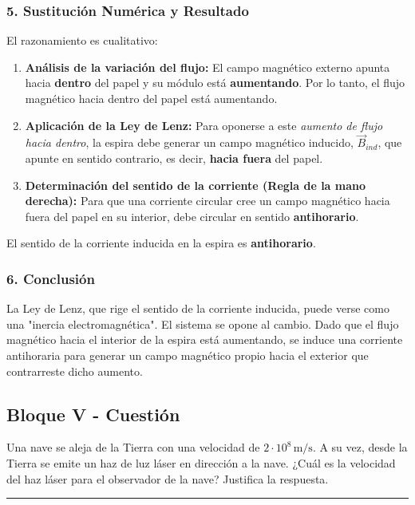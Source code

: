 \subsubsection*{5. Sustitución Numérica y Resultado}
El razonamiento es cualitativo:
\begin{enumerate}
    \item \textbf{Análisis de la variación del flujo:} El campo magnético externo apunta hacia \textbf{dentro} del papel y su módulo está \textbf{aumentando}. Por lo tanto, el flujo magnético hacia dentro del papel está aumentando.
    \item \textbf{Aplicación de la Ley de Lenz:} Para oponerse a este \textit{aumento de flujo hacia dentro}, la espira debe generar un campo magnético inducido, $\vec{B}_{ind}$, que apunte en sentido contrario, es decir, \textbf{hacia fuera} del papel.
    \item \textbf{Determinación del sentido de la corriente (Regla de la mano derecha):} Para que una corriente circular cree un campo magnético hacia fuera del papel en su interior, debe circular en sentido \textbf{antihorario}.
\end{enumerate}
\begin{cajaresultado}
El sentido de la corriente inducida en la espira es \textbf{antihorario}.
\end{cajaresultado}

\subsubsection*{6. Conclusión}
\begin{cajaconclusion}
La Ley de Lenz, que rige el sentido de la corriente inducida, puede verse como una "inercia electromagnética". El sistema se opone al cambio. Dado que el flujo magnético hacia el interior de la espira está aumentando, se induce una corriente antihoraria para generar un campo magnético propio hacia el exterior que contrarreste dicho aumento.
\end{cajaconclusion}

\newpage

\subsection{Bloque V - Cuestión}
\label{subsec:B5_2013_jul_ext}

\begin{cajaenunciado}
Una nave se aleja de la Tierra con una velocidad de $2 \cdot 10^8\,\text{m/s}$. A su vez, desde la Tierra se emite un haz de luz láser en dirección a la nave. ¿Cuál es la velocidad del haz láser para el observador de la nave? Justifica la respuesta.
\end{cajaenunciado}
\hrule

